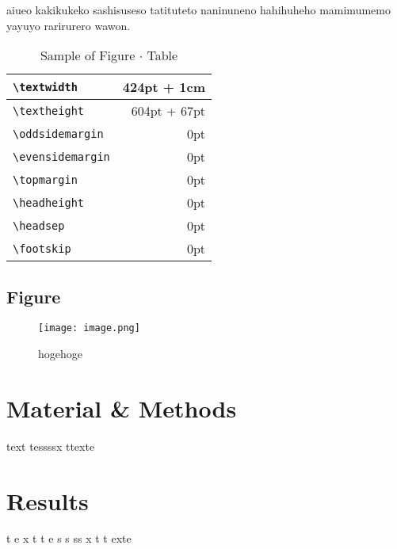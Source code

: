\documentclass[
  ams,
  uplatex]{U-AizuGT}
\begin{document}
    aiueo kakikukeko sashisuseso tatituteto naninuneno hahihuheho mamimumemo
    yayuyo rarirurero wawon.

    \begin{table}[htbp]
      \caption{Sample of Figure $\cdot$ Table}\label{tab:fig}
      \begin{center}
        \begin{tabular}{|l|r|}
          \hline
          \verb+\textwidth+ & 424pt + 1cm  \\ \hline
          \verb+\textheight+ & 604pt + 67pt \\ \hline
          \verb+\oddsidemargin+ & 0pt          \\ \hline
          \verb+\evensidemargin+ & 0pt          \\ \hline
          \verb+\topmargin+ & 0pt          \\ \hline
          \verb+\headheight+ & 0pt          \\ \hline
          \verb+\headsep+ & 0pt          \\ \hline
          \verb+\footskip+ & 0pt          \\ \hline
        \end{tabular}
      \end{center}
    \end{table}

    \hypertarget{figure}{%
    \subsection{Figure}\label{figure}}

    \begin{figure}[htbp]
      \centering
      \texttt{[image: image.png]}
      \caption{hogehoge}\label{fig:hogehoge}
    \end{figure}

    \hypertarget{material-methods}{%
    \section{Material \& Methods}\label{material-methods}}

    text tessssx ttexte

    \hypertarget{results}{%
    \section{Results}\label{results}}

    t e x t t e s s ss x t t exte
\end{document}
